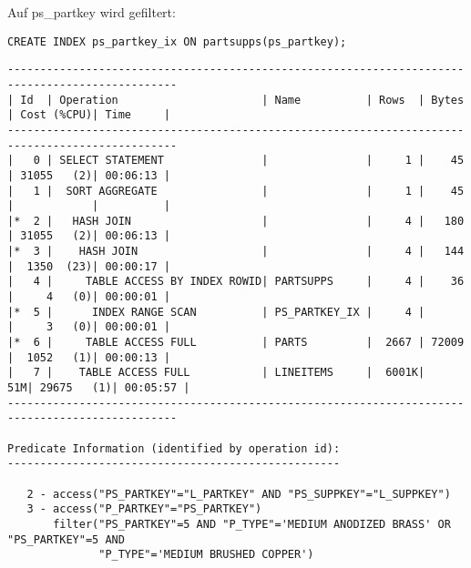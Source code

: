 \documentclass[10pt]{article}
\begin{document}
Auf ps\_partkey wird gefiltert:
\begin{lstlisting}[style=sql]
CREATE INDEX ps_partkey_ix ON partsupps(ps_partkey);
\end{lstlisting}
\begin{lstlisting}[style=queryexecutionplan]
------------------------------------------------------------------------------------------------
| Id  | Operation                      | Name          | Rows  | Bytes | Cost (%CPU)| Time     |
------------------------------------------------------------------------------------------------
|   0 | SELECT STATEMENT               |               |     1 |    45 | 31055   (2)| 00:06:13 |
|   1 |  SORT AGGREGATE                |               |     1 |    45 |            |          |
|*  2 |   HASH JOIN                    |               |     4 |   180 | 31055   (2)| 00:06:13 |
|*  3 |    HASH JOIN                   |               |     4 |   144 |  1350  (23)| 00:00:17 |
|   4 |     TABLE ACCESS BY INDEX ROWID| PARTSUPPS     |     4 |    36 |     4   (0)| 00:00:01 |
|*  5 |      INDEX RANGE SCAN          | PS_PARTKEY_IX |     4 |       |     3   (0)| 00:00:01 |
|*  6 |     TABLE ACCESS FULL          | PARTS         |  2667 | 72009 |  1052   (1)| 00:00:13 |
|   7 |    TABLE ACCESS FULL           | LINEITEMS     |  6001K|    51M| 29675   (1)| 00:05:57 |
------------------------------------------------------------------------------------------------
 
Predicate Information (identified by operation id):
---------------------------------------------------
 
   2 - access("PS_PARTKEY"="L_PARTKEY" AND "PS_SUPPKEY"="L_SUPPKEY")
   3 - access("P_PARTKEY"="PS_PARTKEY")
       filter("PS_PARTKEY"=5 AND "P_TYPE"='MEDIUM ANODIZED BRASS' OR "PS_PARTKEY"=5 AND 
              "P_TYPE"='MEDIUM BRUSHED COPPER')
\end{lstlisting}
\end{document}
